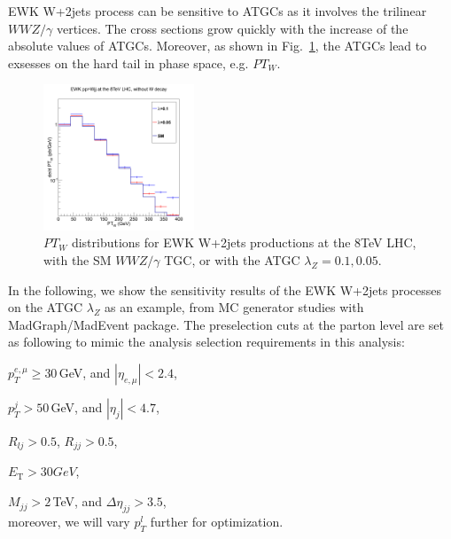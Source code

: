 

EWK W+2jets process can be sensitive to ATGCs as it involves the trilinear $WWZ/\gamma$ vertices. The cross sections grow quickly with the increase of the absolute values of ATGCs. Moreover, as shown in Fig.~\ref{fig:tgcptw}, the ATGCs lead to exsesses on the hard tail in phase space, e.g. $PT_W$.

\begin{figure}[h!]{
\centering
    \includegraphics[width=0.4\textwidth]{figs/tgc.png}
\caption{\label{fig:tgcptw} $PT_W$ distributions for EWK W+2jets productions at the 8TeV LHC, with the SM $WWZ/\gamma$ TGC, or with the ATGC $\lambda_Z=0.1,0.05$.}}
\end{figure}

In the following, we show the sensitivity results of the EWK W+2jets processes on the ATGC $\lambda_Z$ as an example, from MC generator studies with MadGraph/MadEvent package. The preselection cuts at the parton level are set as following to mimic the analysis selection requirements in this analysis:
\begin{itemize}{
\item $p_{T}^{e,\mu} \geq 30\,$GeV, and $|\eta_{e,\mu}|<2.4$,  
\item $p_{T}^{j}>50\,$GeV, and $|\eta_{j}|<4.7$,
\item $R_{lj}>0.5$, $R_{jj}>0.5$,
\item $E_\mathrm{T} > 30GeV$,
\item $M_{jj}>2\,$TeV, and $\Delta\eta_{jj}>3.5$,
\\
moreover, we will vary $p_T^l$ further for optimization.
}
\end{itemize}
 
